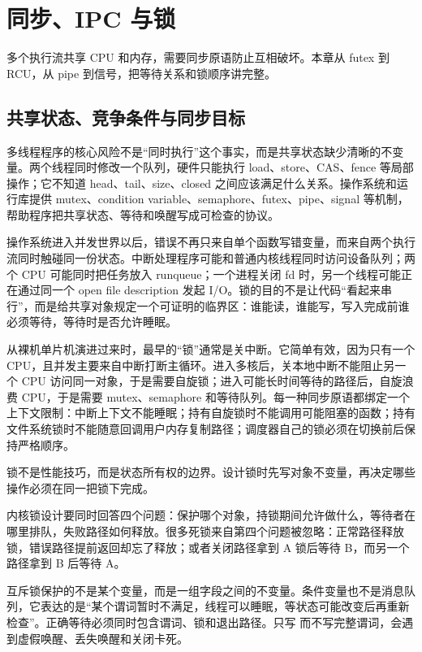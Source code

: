 \chapter{同步、IPC 与锁}

多个执行流共享 CPU 和内存，需要同步原语防止互相破坏。本章从 futex 到 RCU，从 pipe 到信号，把等待关系和锁顺序讲完整。

\section{共享状态、竞争条件与同步目标}

多线程程序的核心风险不是“同时执行”这个事实，而是共享状态缺少清晰的不变量。两个线程同时修改一个队列，硬件只能执行 load、store、CAS、fence 等局部操作；它不知道 head、tail、size、closed 之间应该满足什么关系。操作系统和运行库提供 mutex、condition variable、semaphore、futex、pipe、signal 等机制，帮助程序把共享状态、等待和唤醒写成可检查的协议。

操作系统进入并发世界以后，错误不再只来自单个函数写错变量，而来自两个执行流同时触碰同一份状态。中断处理程序可能和普通内核线程同时访问设备队列；两个 CPU 可能同时把任务放入 runqueue；一个进程关闭 fd 时，另一个线程可能正在通过同一个 open file description 发起 I/O。锁的目的不是让代码“看起来串行”，而是给共享对象规定一个可证明的临界区：谁能读，谁能写，写入完成前谁必须等待，等待时是否允许睡眠。

从裸机单片机演进过来时，最早的“锁”通常是关中断。它简单有效，因为只有一个 CPU，且并发主要来自中断打断主循环。进入多核后，关本地中断不能阻止另一个 CPU 访问同一对象，于是需要自旋锁；进入可能长时间等待的路径后，自旋浪费 CPU，于是需要 mutex、semaphore 和等待队列。每一种同步原语都绑定一个上下文限制：中断上下文不能睡眠；持有自旋锁时不能调用可能阻塞的函数；持有文件系统锁时不能随意回调用户内存复制路径；调度器自己的锁必须在切换前后保持严格顺序。

\begin{keyidea}
锁不是性能技巧，而是状态所有权的边界。设计锁时先写对象不变量，再决定哪些操作必须在同一把锁下完成。
\end{keyidea}

内核锁设计要同时回答四个问题：保护哪个对象，持锁期间允许做什么，等待者在哪里排队，失败路径如何释放。很多死锁来自第四个问题被忽略：正常路径释放锁，错误路径提前返回却忘了释放；或者关闭路径拿到 A 锁后等待 B，而另一个路径拿到 B 后等待 A。

互斥锁保护的不是某个变量，而是一组字段之间的不变量。条件变量也不是消息队列，它表达的是“某个谓词暂时不满足，线程可以睡眠，等状态可能改变后再重新检查”。正确等待必须同时包含谓词、锁和退出路径。只写  而不写完整谓词，会遇到虚假唤醒、丢失唤醒和关闭卡死。

